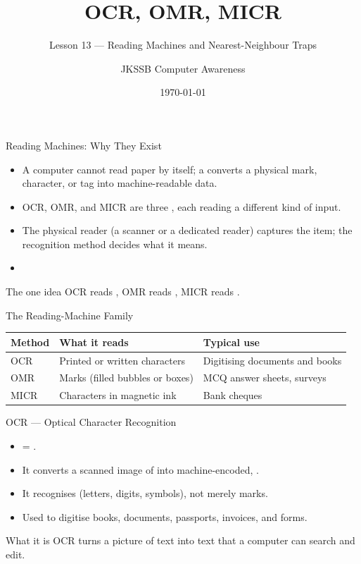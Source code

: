 \documentclass[aspectratio=169]{beamer}
\title{OCR, OMR, MICR}
\subtitle{Lesson 13 --- Reading Machines and Nearest-Neighbour Traps}
\author{JKSSB Computer Awareness}
\date{\today}
\begin{document}
\frame{\titlepage}

\begin{frame}{Reading Machines: Why They Exist}
  \begin{itemize}
    \item A computer cannot read paper by itself; a 
      converts a physical mark, character, or tag into machine-readable data.
    \item OCR, OMR, and MICR are three , each
      reading a different kind of input.
    \item The physical reader (a scanner or a dedicated reader) captures the
      item; the recognition method decides what it means.
    \item {}
  \end{itemize}
  \begin{block}{The one idea}
    OCR reads , OMR reads , MICR reads
    .
  \end{block}
\end{frame}

\begin{frame}{The Reading-Machine Family}
  \begin{center}
    \begin{tabular}{p{}p{}p{}}
      \toprule
      \textbf{Method} & \textbf{What it reads} & \textbf{Typical use} \\
      \midrule
      OCR & Printed or written characters & Digitising documents and books \\
      OMR & Marks (filled bubbles or boxes) & MCQ answer sheets, surveys \\
      MICR & Characters in magnetic ink & Bank cheques \\
      \bottomrule
    \end{tabular}
  \end{center}
  \vspace{0.25cm}
\end{frame}

\begin{frame}{OCR --- Optical Character Recognition}
  \begin{itemize}
    \item {} = .
    \item It converts a scanned image of 
      into machine-encoded, .
    \item It recognises  (letters, digits, symbols), not
      merely marks.
    \item Used to digitise books, documents, passports, invoices, and forms.
  \end{itemize}
  \begin{block}{What it is}
    OCR turns a picture of text into text that a computer can search and
    edit.
  \end{block}
\end{frame}
\end{document}
